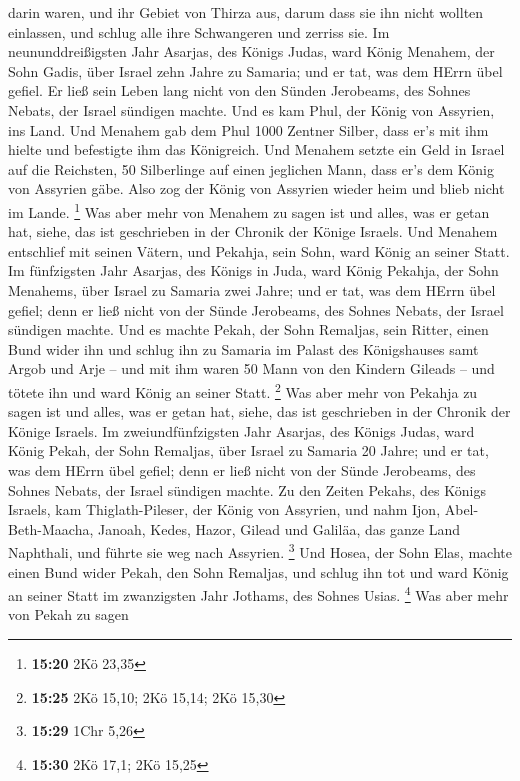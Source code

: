 darin waren, und ihr Gebiet von Thirza aus, darum dass sie ihn nicht
wollten einlassen, und schlug alle ihre Schwangeren und zerriss sie.
 Im neununddreißigsten Jahr Asarjas, des Königs Judas, ward
König Menahem, der Sohn Gadis, über Israel zehn Jahre zu Samaria;
 und er tat, was dem HErrn übel gefiel. Er ließ sein Leben
lang nicht von den Sünden Jerobeams, des Sohnes Nebats, der Israel
sündigen machte.  Und es kam Phul, der König von Assyrien,
ins Land. Und Menahem gab dem Phul 1000 Zentner Silber, dass er's mit
ihm hielte und befestigte ihm das Königreich.  Und Menahem
setzte ein Geld in Israel auf die Reichsten, 50 Silberlinge auf einen
jeglichen Mann, dass er's dem König von Assyrien gäbe. Also zog der
König von Assyrien wieder heim und blieb nicht im Lande. \footnote{\textbf{15:20}
  2Kö 23,35}  Was aber mehr von Menahem zu sagen ist und
alles, was er getan hat, siehe, das ist geschrieben in der Chronik der
Könige Israels.  Und Menahem entschlief mit seinen Vätern,
und Pekahja, sein Sohn, ward König an seiner Statt.  Im
fünfzigsten Jahr Asarjas, des Königs in Juda, ward König Pekahja, der
Sohn Menahems, über Israel zu Samaria zwei Jahre;  und er
tat, was dem HErrn übel gefiel; denn er ließ nicht von der Sünde
Jerobeams, des Sohnes Nebats, der Israel sündigen machte. 
Und es machte Pekah, der Sohn Remaljas, sein Ritter, einen Bund wider
ihn und schlug ihn zu Samaria im Palast des Königshauses samt Argob und
Arje -- und mit ihm waren 50 Mann von den Kindern Gileads -- und tötete
ihn und ward König an seiner Statt. \footnote{\textbf{15:25} 2Kö 15,10;
  2Kö 15,14; 2Kö 15,30}  Was aber mehr von Pekahja zu sagen
ist und alles, was er getan hat, siehe, das ist geschrieben in der
Chronik der Könige Israels.  Im zweiundfünfzigsten Jahr
Asarjas, des Königs Judas, ward König Pekah, der Sohn Remaljas, über
Israel zu Samaria 20 Jahre;  und er tat, was dem HErrn übel
gefiel; denn er ließ nicht von der Sünde Jerobeams, des Sohnes Nebats,
der Israel sündigen machte.  Zu den Zeiten Pekahs, des
Königs Israels, kam Thiglath-Pileser, der König von Assyrien, und nahm
Ijon, Abel-Beth-Maacha, Janoah, Kedes, Hazor, Gilead und Galiläa, das
ganze Land Naphthali, und führte sie weg nach Assyrien. \footnote{\textbf{15:29}
  1Chr 5,26}  Und Hosea, der Sohn Elas, machte einen Bund
wider Pekah, den Sohn Remaljas, und schlug ihn tot und ward König an
seiner Statt im zwanzigsten Jahr Jothams, des Sohnes Usias. \footnote{\textbf{15:30}
  2Kö 17,1; 2Kö 15,25}  Was aber mehr von Pekah zu sagen
